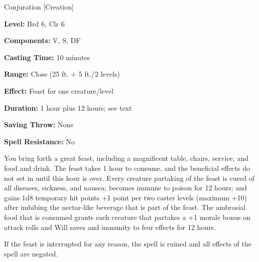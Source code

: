 
Conjuration [Creation]

\textbf{Level:} Brd 6, Clr 6

\textbf{Components:} V, S, DF

\textbf{Casting Time:} 10 minutes

\textbf{Range:} Close (25 ft. + 5 ft./2 levels)

\textbf{Effect:} Feast for one creature/level

\textbf{Duration:} 1 hour plus 12 hours; see text

\textbf{Saving Throw:} None

\textbf{Spell Resistance:} No

You bring forth a great feast, including a magnificent table, chairs, service, 
and food and drink. The feast takes 1 hour to consume, and the beneficial effects 
do not set in until this hour is over. Every creature partaking of the feast is 
cured of all diseases, sickness, and nausea; becomes immune to poison for 12 hours; 
and gains 1d8 temporary hit points +1 point per two caster levels (maximum +10) 
after imbibing the nectar-like beverage that is part of the feast. The ambrosial 
food that is consumed grants each creature that partakes a +1 morale bonus on attack 
rolls and Will saves and immunity to fear effects for 12 hours.

If the feast is interrupted for any reason, the spell is ruined and all effects 
of the spell are negated.

